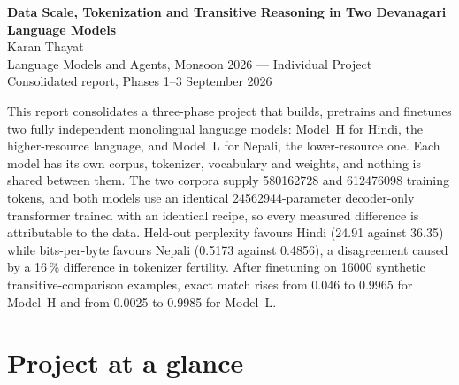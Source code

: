 \documentclass[10pt,a4paper]{article}
\newcommand{\pc}[1]{#1\,\%}
\begin{document}
\begin{center}
  {\LARGE\bfseries\sffamily Data Scale, Tokenization and Transitive Reasoning in Two Devanagari Language Models}\\[4pt]
  {\large Karan Thayat}\\[2pt]
  {\small Language Models and Agents, Monsoon 2026 --- Individual Project\\
   Consolidated report, Phases 1--3 \quad\textbullet{} September 2026}
\end{center}
\vspace{-2pt}

\noindent
\begin{minipage}{\linewidth}
\small
This report consolidates a three-phase project that builds, pretrains and
finetunes two fully independent monolingual language models: Model~H for Hindi,
the higher-resource language, and Model~L for Nepali, the lower-resource one.
Each model has its own corpus, tokenizer, vocabulary and weights, and nothing is
shared between them. The two corpora supply \num{580162728} and \num{612476098}
training tokens, and both models use an identical \num{24562944}-parameter
decoder-only transformer trained with an identical recipe, so every measured
difference is attributable to the data. Held-out perplexity favours Hindi (24.91
against 36.35) while bits-per-byte favours Nepali (0.5173 against 0.4856), a
disagreement caused by a \pc{16} difference in tokenizer fertility. After
finetuning on \num{16000} synthetic transitive-comparison examples, exact match
rises from 0.046 to 0.9965 for Model~H and from 0.0025 to 0.9985 for Model~L.
\end{minipage}
\vspace{4pt}

\section{Project at a glance}
\end{document}
